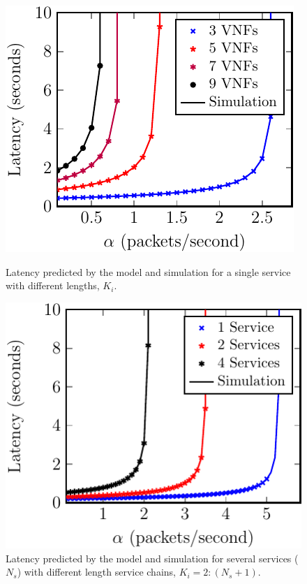 
\begin{figure}

	\begin{minipage}[b]{.49\textwidth}
		\includegraphics[width=\linewidth]{graphs/diff_lengths-crop}
		\caption{Latency predicted by the model and simulation for a single service with different lengths, $K_i$.}
		\label{fig:length_chain}
	\end{minipage}
	\hfill
	\begin{minipage}[b]{.49\textwidth}
		\includegraphics[width=\linewidth]{graphs/mult_services-crop}
		\caption{Latency predicted by the model and simulation for several services ($N_s$)
			with different length service chains, $K_i = 2:(N_s+1)$.}
		\label{fig:mult_services}
	\end{minipage}


\end{figure}
